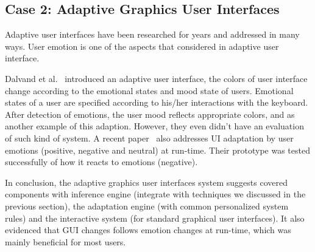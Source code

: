 \subsection{Case 2: Adaptive Graphics User Interfaces}
Adaptive user interfaces have been researched for years \cite{schneider1993adaptive, langley1997machine} and addressed in many ways. User emotion is one of the aspects that considered in adaptive user interface.

Dalvand et al.~\cite{Dalvand} introduced an adaptive user interface, the colors of user interface change according to the emotional states and mood state of users. Emotional states of a user are specified according to his/her interactions with the keyboard. After detection of emotions, the user mood reflects appropriate colors, and \cite{Kaiser2006} as another example of this adaption. However, they even didn't have an evaluation of such kind of system.
A recent paper~\cite{Galindo} also addresses UI adaptation by user emotions (positive, negative and neutral) at run-time. Their prototype was tested successfully of how it reacts to emotions (negative).

In conclusion, the adaptive graphics user interfaces system suggests covered components with inference engine (integrate with techniques we discussed in the previous section), the adaptation engine (with common personalized system rules) and the interactive system (for standard graphical user interfaces). It also evidenced that GUI changes follows emotion changes at run-time, which was mainly beneficial for most users.
